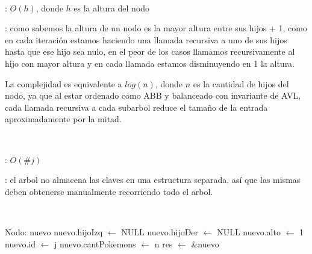 \begin{Algoritmos}
	~

	\begin{algorithm}[H]
		\NoCaptionOfAlgo
		\caption{}
		\BlankLine
	\end{algorithm}

	\complejidad: $O(h)$, donde $h$ es la altura del nodo

	\justifcomp: como sabemos la altura de un nodo es la mayor altura entre sus hijos + 1, como en cada iteración estamos haciendo una llamada recursiva a uno de sus hijos hasta que ese hijo sea nulo, en el peor de los casos llamamos recursivamente al hijo con mayor altura y en cada llamada estamos disminuyendo en 1 la altura.

	La complejidad es equivalente a $log(n)$, donde $n$ es la cantidad de hijos del nodo, ya que al estar ordenado como ABB y balanceado con invariante de AVL, cada llamada recursiva a cada subarbol reduce el tamaño de la entrada aproximadamente por la mitad.

	~

	\begin{algorithm}[H]
		\NoCaptionOfAlgo
		\caption{}
		\BlankLine
	\end{algorithm}
	
	\complejidad: $O(\#j)$

	\justifcomp: el arbol no almacena las claves en una estructura separada, así que las mismas deben obtenerse manualmente recorriendo todo el arbol.

	~

	\begin{algorithm}[H]
		\NoCaptionOfAlgo
		\caption{}
		\BlankLine
		Nodo: nuevo
		nuevo.hijoIzq $\leftarrow$ NULL
		nuevo.hijoDer $\leftarrow$ NULL
		nuevo.alto $\leftarrow$ 1
		nuevo.id $\leftarrow$ j
		nuevo.cantPokemons $\leftarrow$ n
		res $\leftarrow$ \&nuevo
	\end{algorithm}
	

\end{Algoritmos}

